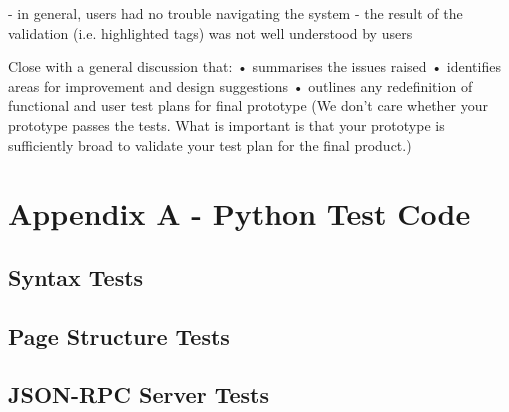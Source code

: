 \documentclass[10pt]{article}
\begin{document}
- in general, users had no trouble navigating the system
- the result of the validation (i.e. highlighted tags) was not well understood by users

Close with a general discussion that: 
• summarises the issues raised 
• identifies areas for improvement and design suggestions 
• outlines any redefinition of functional and user test plans for final 
prototype 
(We don’t care whether your prototype passes the tests. What is 
important is that your prototype is sufficiently broad to validate your test 
plan for the final product.)

\newpage

\section*{Appendix A - Python Test Code}

\subsection*{Syntax Tests}



\newpage

\subsection*{Page Structure Tests}



\newpage

\subsection*{JSON-RPC Server Tests}


\end{document}
